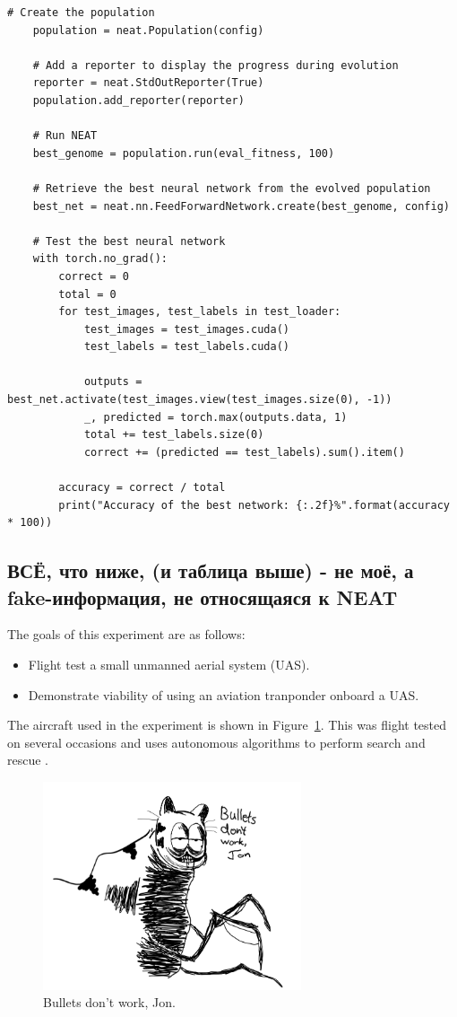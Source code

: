 \documentclass{article}
\begin{document}
\begin{lstlisting}[style=pythonstyle, caption={Программный код реализации алгоритма NEAT с применением модуля PyTorch}, label={lst:pythoncode}]
	# Create the population
	population = neat.Population(config)
	
	# Add a reporter to display the progress during evolution
	reporter = neat.StdOutReporter(True)
	population.add_reporter(reporter)
	
	# Run NEAT
	best_genome = population.run(eval_fitness, 100)
	
	# Retrieve the best neural network from the evolved population
	best_net = neat.nn.FeedForwardNetwork.create(best_genome, config)
	
	# Test the best neural network
	with torch.no_grad():
		correct = 0
		total = 0
		for test_images, test_labels in test_loader:
			test_images = test_images.cuda()
			test_labels = test_labels.cuda()
			
			outputs = best_net.activate(test_images.view(test_images.size(0), -1))
			_, predicted = torch.max(outputs.data, 1)
			total += test_labels.size(0)
			correct += (predicted == test_labels).sum().item()
		
		accuracy = correct / total
		print("Accuracy of the best network: {:.2f}%".format(accuracy * 100))
\end{lstlisting}

\subsection{ВСЁ, что ниже, (и таблица выше) - не моё, а fake-информация, не относящаяся к NEAT}
The goals of this experiment are as follows:

\begin{itemize}
    \item Flight test a small unmanned aerial system (UAS).
    \item Demonstrate viability of using an aviation tranponder onboard a UAS.
\end{itemize}

The aircraft used in the experiment is shown in Figure~\ref{fig:Aircraft}.  This was flight tested on several occasions \cite{Lum_ADSB_sUAS_2017} and uses autonomous algorithms to perform search and rescue \cite{Lum_Searching_JACIC_2010}.  

\begin{figure}[ht]
	\centering
    \includegraphics[width=3in]{jon1}
    \caption{Bullets don't work, Jon.}
    \label{fig:Aircraft}
\end{figure}
\end{document}
